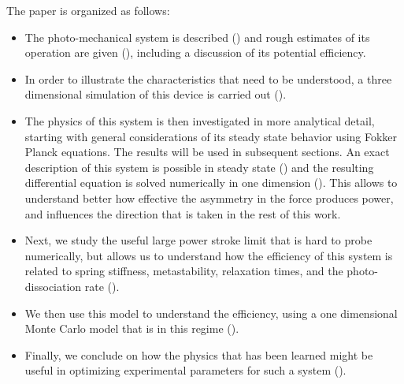 \documentclass[journal = mamobx, manuscript = article]{achemso}
\begin{document}
The paper is organized as follows: 
\begin{itemize}
\item The
photo-mechanical system is described () and rough estimates of its
operation are given (), including a discussion
of its potential efficiency. 
\item In order to illustrate the characteristics
that need to be understood, a three dimensional simulation of this device
is carried out (). 
\item The physics of this system is then
investigated in more analytical detail, starting with general considerations of its steady state behavior using Fokker Planck equations. The results will be used in subsequent sections. An exact description of this
system is possible in steady state () and the resulting differential equation
is solved numerically in one dimension (). This allows
to understand better how effective the asymmetry in the force produces power,
and influences the direction that is taken in the rest of this work. 
\item Next, we study the useful large power stroke limit that is hard to probe
numerically, but allows us to understand how the efficiency of this system is
related to spring stiffness, metastability, relaxation times, and the
photo-dissociation rate (). 
\item We then use this model to understand the efficiency,
using a one dimensional Monte Carlo model that is in this regime ().
\item Finally, we conclude on how the physics that has been learned 
might be useful in optimizing experimental parameters for such a system ().
\end{itemize}
\end{document}
